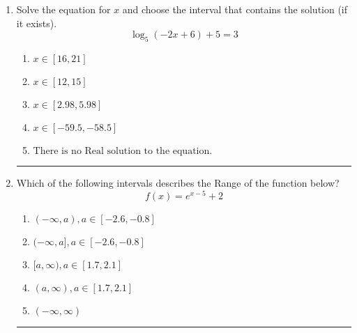 \documentclass[14pt]{extbook}
\newcommand{\litem}[1]{\item#1\hspace*{-1cm}\rule{\textwidth}{0.4pt}}
\begin{document}
\begin{enumerate}
{\begin{enumerate}[label=\Alph*.]
\end{enumerate} }
\litem{
Solve the equation for $x$ and choose the interval that contains the solution (if it exists).\[ \log_{5}{(-2x+6)}+5 = 3 \]\begin{enumerate}[label=\Alph*.]
\item \( x \in [16, 21] \)
\item \( x \in [12, 15] \)
\item \( x \in [2.98, 5.98] \)
\item \( x \in [-59.5, -58.5] \)
\item \( \text{There is no Real solution to the equation.} \)

\end{enumerate} }
\litem{
Which of the following intervals describes the Range of the function below?\[ f(x) = e^{x-5}+2 \]\begin{enumerate}[label=\Alph*.]
\item \( (-\infty, a), a \in [-2.6, -0.8] \)
\item \( (-\infty, a], a \in [-2.6, -0.8] \)
\item \( [a, \infty), a \in [1.7, 2.1] \)
\item \( (a, \infty), a \in [1.7, 2.1] \)
\item \( (-\infty, \infty) \)

\end{enumerate} }
\end{enumerate}
\end{document}
